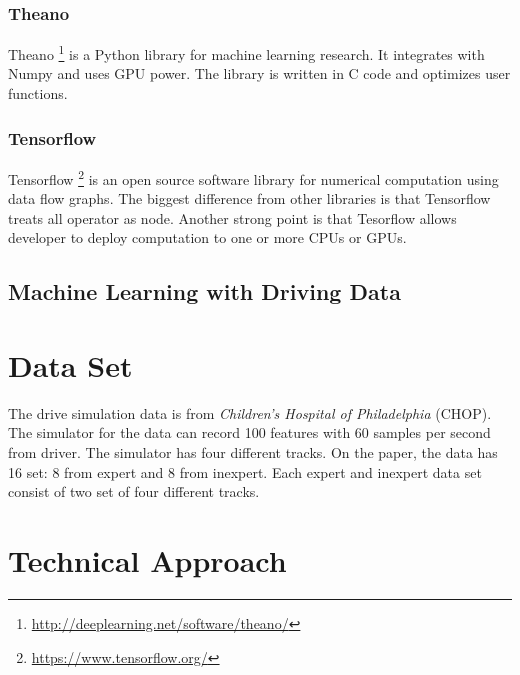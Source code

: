 \documentclass[draft,dvipsnames]{drexel-thesis}
\begin{document}
\begin{thesis}
\subsection{Theano}
Theano \footnote{\url{http://deeplearning.net/software/theano/}} is a Python library for machine learning research. It integrates with Numpy and uses GPU power. The library is written in C code and optimizes user functions.

\subsection{Tensorflow}
Tensorflow \footnote{\url{https://www.tensorflow.org/}} is an open source software library for numerical computation using data flow graphs. The biggest difference from other libraries is that Tensorflow treats all operator as node. Another strong point is that Tesorflow allows developer to deploy computation to one or more CPUs or GPUs. 


\section{Machine Learning with Driving Data}\label{sec:MLDD}

\chapter{Data Set}


The drive simulation data is from \textit{Children's Hospital of Philadelphia} (CHOP). The simulator for the data can record 100 features with 60 samples per second from driver. The simulator has four different tracks. On the paper, the data has 16 set: 8 from expert and 8 from inexpert. Each expert and inexpert data set consist of two set of four different tracks.

\chapter{Technical Approach}


\end{thesis}
\end{document}
